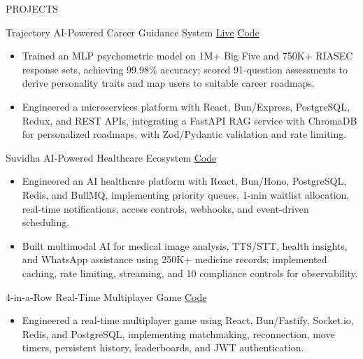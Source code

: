 \documentclass{resume} %
\begin{document}
\begin{rSection}{PROJECTS}

\setlength{\parskip}{6pt}
\setlength{\parindent}{2pt}

\projectHeading
{Trajectory}
{AI-Powered Career Guidance System}
{\href{https://career-counselling-system.vercel.app/}{Live}}
{\href{https://github.com/Riyanshverma/career-counselling-system}{Code}}

\begin{itemize}
\itemsep -3pt {}

\item Trained an MLP psychometric model on 1M+ Big Five and 750K+ RIASEC response sets, achieving 99.98\% accuracy; scored 91-question assessments to derive personality traits and map users to suitable career roadmaps.


\item Engineered a microservices platform with React, Bun/Express, PostgreSQL, Redux, and REST APIs, integrating a FastAPI RAG service with ChromaDB for personalized roadmaps, with Zod/Pydantic validation and rate limiting.

\end{itemize}

\projectHeading
{Suvidha}
{AI-Powered Healthcare Ecosystem}
{}
{\href{https://github.com/Riyanshverma/suvidha}{Code}}

\begin{itemize}
\itemsep -3pt {}

\item Engineered an AI healthcare platform with React, Bun/Hono, PostgreSQL, Redis, and BullMQ, implementing priority queues, 1-min waitlist allocation, real-time notifications, access controls, webhooks, and event-driven scheduling.

\item Built multimodal AI for medical image analysis, TTS/STT, health insights, and WhatsApp assistance using 250K+ medicine records; implemented caching, rate limiting, streaming, and 10 compliance controls for observability.

\end{itemize}

\projectHeading
{4-in-a-Row}
{Real-Time Multiplayer Game}
{}
{\href{https://github.com/Riyanshverma/4-in-a-row}{Code}}

\begin{itemize}
\itemsep -3pt {}

\item Engineered a real-time multiplayer game using React, Bun/Fastify, Socket.io, Redis, and PostgreSQL, implementing matchmaking, reconnection, move timers, persistent history, leaderboards, and JWT authentication.


\end{itemize}
\end{rSection}
\end{document}
